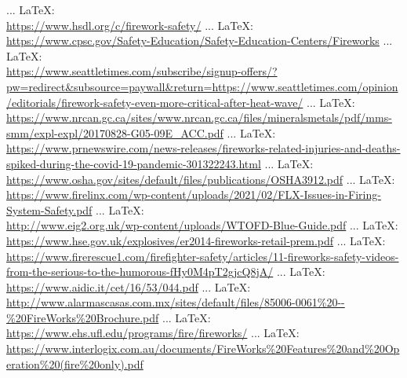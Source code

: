 \begin{thebibliography}{99}
{{{{{{{{							
							 ... \LaTeX:\\ \url{https://www.hsdl.org/c/firework-safety/}
							 ... \LaTeX:\\ \url{https://www.cpsc.gov/Safety-Education/Safety-Education-Centers/Fireworks}
							 ... \LaTeX:\\ \url{https://www.seattletimes.com/subscribe/signup-offers/?pw=redirect&subsource=paywall&return=https://www.seattletimes.com/opinion/editorials/firework-safety-even-more-critical-after-heat-wave/}
							 ... \LaTeX:\\ \url{https://www.nrcan.gc.ca/sites/www.nrcan.gc.ca/files/mineralsmetals/pdf/mms-smm/expl-expl/20170828-G05-09E_ACC.pdf}
							 ... \LaTeX:\\ \url{https://www.prnewswire.com/news-releases/fireworks-related-injuries-and-deaths-spiked-during-the-covid-19-pandemic-301322243.html}
							 ... \LaTeX:\\ \url{https://www.osha.gov/sites/default/files/publications/OSHA3912.pdf}
							 ... \LaTeX:\\ \url{https://www.firelinx.com/wp-content/uploads/2021/02/FLX-Issues-in-Firing-System-Safety.pdf}
							 ... \LaTeX:\\ \url{http://www.eig2.org.uk/wp-content/uploads/WTOFD-Blue-Guide.pdf}
							 ... \LaTeX:\\ \url{https://www.hse.gov.uk/explosives/er2014-fireworks-retail-prem.pdf}
							 ... \LaTeX:\\ \url{https://www.firerescue1.com/firefighter-safety/articles/11-fireworks-safety-videos-from-the-serious-to-the-humorous-fHy0M4pT2gjcQ8jA/}
							 ... \LaTeX:\\ \url{https://www.aidic.it/cet/16/53/044.pdf}
							 ... \LaTeX:\\ \url{http://www.alarmascasas.com.mx/sites/default/files/85006-0061%20--%20FireWorks%20Brochure.pdf}
							 ... \LaTeX:\\ \url{https://www.ehs.ufl.edu/programs/fire/fireworks/}
							 ... \LaTeX:\\ \url{https://www.interlogix.com.au/documents/FireWorks%20Features%20and%20Operation%20(fire%20only).pdf}
}}}}}}}}
\end{thebibliography}
